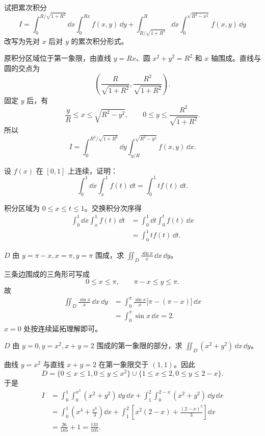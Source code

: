 \begin{xexercise}[1]
试把累次积分
  \[
    I=\int_0^{R/\sqrt{1+R^2}}\dd x\int_0^{Rx}f(x,y)\,\dd y
    +\int_{R/\sqrt{1+R^2}}^R\dd x\int_0^{\sqrt{R^2-x^2}}f(x,y)\,\dd y
  \]
  改写为先对 $x$ 后对 $y$ 的累次积分形式。
\end{xexercise}
\begin{xsolution}
原积分区域位于第一象限，由直线 $y=Rx$、圆 $x^2+y^2=R^2$ 和 $x$ 轴围成。直线与圆的交点为
\[
  \left(\frac{R}{\sqrt{1+R^2}},\frac{R^2}{\sqrt{1+R^2}}\right).
\]
固定 $y$ 后，有
\[
  \frac yR\le x\le\sqrt{R^2-y^2},
  \qquad0\le y\le\frac{R^2}{\sqrt{1+R^2}}.
\]
所以
\[
  \boxed{
  I=\int_0^{R^2/\sqrt{1+R^2}}\dd y
  \int_{y/R}^{\sqrt{R^2-y^2}}f(x,y)\,\dd x }.
\]
\end{xsolution}


\begin{xexercise}[2]
设 $f(x)$ 在 $[0,1]$ 上连续，证明：
  \[
    \int_0^1\dd x\int_x^1 f(t)\,\dd t=\int_0^1 t f(t)\,\dd t.
  \]
\end{xexercise}
\begin{xsolution}
积分区域为 $0\le x\le t\le1$。交换积分次序得
\begin{align*}
  \int_0^1\dd x\int_x^1f(t)\,\dd t
  &=\int_0^1\dd t\int_0^t f(t)\,\dd x\\
  &=\int_0^1t f(t)\,\dd t.
\end{align*}
\end{xsolution}


\begin{xexercise}[3]
$D$ 由 $y=\pi-x,x=\pi,y=\pi$ 围成，求 $\displaystyle\iint_D\frac{\sin x}{x}\,\dd x\,\dd y$。
\end{xexercise}
\begin{xsolution}
三条边围成的三角形可写成
\[
  0\le x\le\pi,\qquad \pi-x\le y\le\pi.
\]
故
\begin{align*}
  \iint_D\frac{\sin x}{x}\,\dd x\,\dd y
  &=\int_0^\pi\frac{\sin x}{x}\bigl[\pi-(\pi-x)\bigr]\,\dd x\\
  &=\int_0^\pi\sin x\,\dd x=\boxed{2}.
\end{align*}
$x=0$ 处按连续延拓理解即可。
\end{xsolution}


\begin{xexercise}[4]
$D$ 由 $y=0,y=x^2,x+y=2$ 围成的第一象限的部分，求 $\displaystyle\iint_D(x^2+y^2)\,\dd x\,\dd y$。
\end{xexercise}
\begin{xsolution}
曲线 $y=x^2$ 与直线 $x+y=2$ 在第一象限交于 $(1,1)$。因此
\[
  D=\{0\le x\le1,0\le y\le x^2\}
  \cup\{1\le x\le2,0\le y\le2-x\}.
\]
于是
\begin{align*}
 I&=\int_0^1\int_0^{x^2}(x^2+y^2)\,\dd y\,\dd x
 +\int_1^2\int_0^{2-x}(x^2+y^2)\,\dd y\,\dd x\\
 &=\int_0^1\left(x^4+\frac{x^6}{3}\right)\dd x
 +\int_1^2\left[x^2(2-x)+\frac{(2-x)^3}{3}\right]\dd x\\
 &=\frac{26}{105}+1=\boxed{\frac{131}{105}}.
\end{align*}
\end{xsolution}


